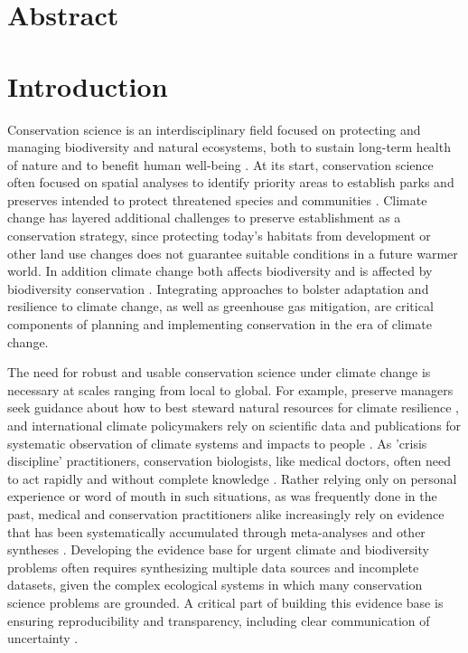\documentclass{article}
\begin{document}


\section*{Abstract} 


\newpage
\section* {Introduction}

Conservation science is an interdisciplinary field focused on protecting and managing biodiversity and natural ecosystems, both to sustain long-term health of nature and to benefit human well-being \citep{kareiva2012conservation}. At its start, conservation science often focused on spatial analyses to identify priority areas to establish parks and preserves intended to protect threatened species and communities \citep{bocking2020science}. Climate change has layered additional challenges to preserve establishment as a conservation strategy, since protecting today's habitats from development or other land use changes does not guarantee suitable conditions in a future warmer world. In addition climate change both affects biodiversity \citep[e.g., by causing extinctions][]{urban2024climate} and is affected by biodiversity conservation \citep[e.g., nature-based climate solutions or `natural climate solutions'][]{griscom2017natural}. Integrating approaches to bolster adaptation and resilience to climate change, as well as greenhouse gas mitigation, are critical components of planning and implementing conservation in the era of climate change.

\par The need for robust and usable conservation science under climate change is necessary at scales ranging from local to global. For example, preserve managers seek guidance about how to best steward natural resources for climate resilience \citep{Nadeau2015}, and  international climate policymakers rely on scientific data and publications for systematic observation of climate systems and impacts to people \cite{ipcc2007}. As 'crisis discipline' practitioners, conservation biologists, like medical doctors, often need to act rapidly and without complete knowledge \citep{soule1985conservation}. Rather relying only on personal experience or word of mouth in such situations, as was frequently done in the past, medical and conservation practitioners alike increasingly rely on evidence that has been systematically accumulated through meta-analyses and other syntheses \citep{kareiva2012conservation}. Developing the evidence base for urgent climate and biodiversity problems often requires synthesizing multiple data sources and incomplete datasets, given the complex ecological systems in which many conservation science problems are grounded. A critical part of building this evidence base is ensuring reproducibility and transparency, including clear communication of uncertainty \citep{ellis2024principles,ipcc2007}. 
\end{document}
